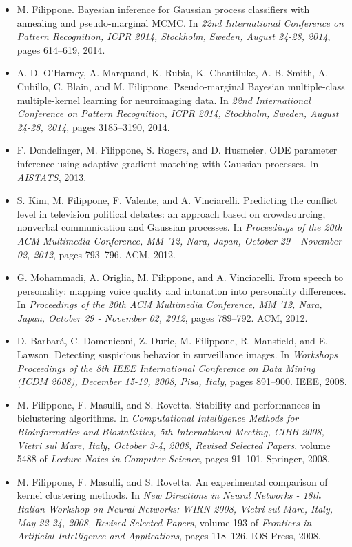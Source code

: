 \begin{itemize}
\item  M. Filippone. Bayesian inference for Gaussian process classifiers with annealing and pseudo-marginal MCMC. In \emph{22nd International Conference on Pattern Recognition, ICPR 2014, Stockholm, Sweden, August 24-28, 2014}, pages 614--619, 2014.  
\item  A. D. O'Harney, A. Marquand, K. Rubia, K. Chantiluke, A. B. Smith, A. Cubillo, C. Blain, and M. Filippone. Pseudo-marginal Bayesian multiple-class multiple-kernel learning for neuroimaging data. In \emph{22nd International Conference on Pattern Recognition, ICPR 2014, Stockholm, Sweden, August 24-28, 2014}, pages 3185--3190, 2014.  
\item  F. Dondelinger, M. Filippone, S. Rogers, and D. Husmeier. ODE parameter inference using adaptive gradient matching with Gaussian processes. In \emph{AISTATS}, 2013.  
\item  S. Kim, M. Filippone, F. Valente, and A. Vinciarelli. Predicting the conflict level in television political debates: an approach based on crowdsourcing, nonverbal communication and Gaussian processes. In \emph{Proceedings of the 20th ACM Multimedia Conference, MM '12, Nara, Japan, October 29 - November 02, 2012}, pages 793--796. ACM, 2012.  
\item  G. Mohammadi, A. Origlia, M. Filippone, and A. Vinciarelli. From speech to personality: mapping voice quality and intonation into personality differences. In \emph{Proceedings of the 20th ACM Multimedia Conference, MM '12, Nara, Japan, October 29 - November 02, 2012}, pages 789--792. ACM, 2012.  
\item  D. Barbar\'a, C. Domeniconi, Z. Duric, M. Filippone, R. Mansfield, and E. Lawson. Detecting suspicious behavior in surveillance images. In \emph{Workshops Proceedings of the 8th IEEE International Conference on Data Mining (ICDM 2008), December 15-19, 2008, Pisa, Italy}, pages 891--900. IEEE, 2008.  
\item  M. Filippone, F. Masulli, and S. Rovetta. Stability and performances in biclustering algorithms. In \emph{Computational Intelligence Methods for Bioinformatics and Biostatistics, 5th International Meeting, CIBB 2008, Vietri sul Mare, Italy, October 3-4, 2008, Revised Selected Papers}, volume 5488 of \emph{Lecture Notes in Computer Science}, pages 91--101. Springer, 2008.  
\item  M. Filippone, F. Masulli, and S. Rovetta. An experimental comparison of kernel clustering methods. In \emph{New Directions in Neural Networks - 18th Italian Workshop on Neural Networks: WIRN 2008, Vietri sul Mare, Italy, May 22-24, 2008, Revised Selected Papers}, volume 193 of \emph{Frontiers in Artificial Intelligence and Applications}, pages 118--126. IOS Press, 2008.  

\end{itemize}
